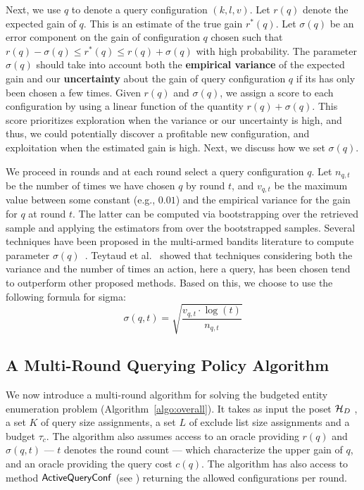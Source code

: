 Next, we use $q$ to denote a query configuration $(k,l,v)$. Let $r(q)$ denote the expected gain of $q$. This is an estimate of the true gain $r^*(q)$. Let $\sigma(q)$ be an error component on the gain of configuration $q$ chosen such that $r(q) - \sigma(q) \leq r^*(q) \leq r(q) + \sigma(q)$ with high probability. The parameter $\sigma(q)$ should take into account both the {\bf empirical variance} of the expected gain and our {\bf uncertainty} about the gain of query configuration $q$ if its has only been chosen a few times. Given $r(q)$ and $\sigma(q)$, we assign a score to each configuration by using a linear function of the quantity $r(q) + \sigma(q)$. This score prioritizes exploration when the variance or our uncertainty is high, and thus, we could potentially discover a profitable new configuration, and exploitation when the estimated gain is high. Next, we discuss how we set $\sigma(q)$.

We proceed in rounds and at each round select a query configuration $q$. Let $n_{q,t}$ be the number of times we have chosen $q$ by round $t$, and $v_{q,t}$ be the maximum value between some constant (e.g., $0.01$) and the empirical variance for the gain for $q$ at round $t$. The latter can be computed via bootstrapping over the retrieved sample and applying the estimators from  over the bootstrapped samples. Several techniques have been proposed in the multi-armed bandits literature to compute parameter $\sigma(q)$~\cite{teytaud:inria-00173263}. Teytaud et al.~\cite{teytaud:inria-00173263} showed that techniques considering both the variance and the number of times an action, here a query, has been chosen tend to outperform other proposed methods. Based on this, we choose to use the following formula for sigma:
{\small \begin{equation}
\label{eq:upper}
\sigma(q,t) = \sqrt{\frac{v_{q,t}\cdot\log(t)}{n_{q,t}}}
\end{equation}}

\subsection{A Multi-Round Querying Policy Algorithm}
\label{sec:heuristic}

We now introduce a multi-round algorithm for solving the budgeted entity enumeration problem (Algorithm~\ref{algo:overall}). It takes as input the poset $\mathcal{H}_D$ , a set $K$ of query size assignments, a set $L$ of exclude list size assignments and a budget $\tau_c$. The algorithm also assumes access to an oracle providing $r(q)$ and $\sigma(q,t)$ --- $t$ denotes the round count ---  which characterize the upper gain of $q$, and an oracle providing the query cost $c(q)$. The algorithm has also access to method ${\sf ActiveQueryConf}$ (see ) returning the allowed configurations per round.

